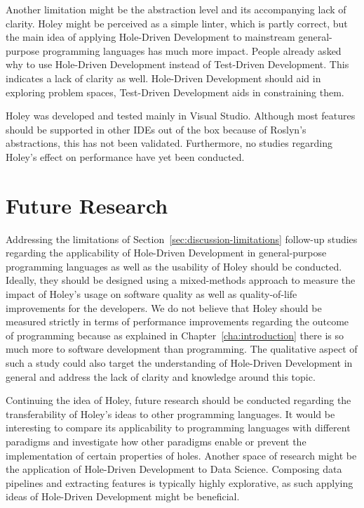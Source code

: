 Another limitation might be the abstraction level and its accompanying lack of clarity.
Holey might be perceived as a simple linter, which is partly correct, but the main idea of applying Hole-Driven Development to mainstream general-purpose programming languages has much more impact.
People already asked why to use Hole-Driven Development instead of Test-Driven Development.
This indicates a lack of clarity as well.
Hole-Driven Development should aid in exploring problem spaces, Test-Driven Development aids in constraining them.

Holey was developed and tested mainly in Visual Studio.
Although most features should be supported in other IDEs out of the box because of Roslyn's abstractions, this has not been validated.
Furthermore, no studies regarding Holey's effect on performance have yet been conducted.


\section{Future Research}
\label{sec:discussion-future-research}
Addressing the limitations of Section~\ref{sec:discussion-limitations} follow-up studies regarding the applicability of Hole-Driven Development in general-purpose programming languages as well as the usability of Holey should be conducted.
Ideally, they should be designed using a mixed-methods approach to measure the impact of Holey's usage on software quality as well as quality-of-life improvements for the developers.
We do not believe that Holey should be measured strictly in terms of performance improvements regarding the outcome of programming because as explained in Chapter~\ref{cha:introduction} there is so much more to software development than programming.
The qualitative aspect of such a study could also target the understanding of Hole-Driven Development in general and address the lack of clarity and knowledge around this topic.

Continuing the idea of Holey, future research should be conducted regarding the transferability of Holey's ideas to other programming languages.
It would be interesting to compare its applicability to programming languages with different paradigms and investigate how other paradigms enable or prevent the implementation of certain properties of holes.
Another space of research might be the application of Hole-Driven Development to Data Science.
Composing data pipelines and extracting features is typically highly explorative, as such applying ideas of Hole-Driven Development might be beneficial.

